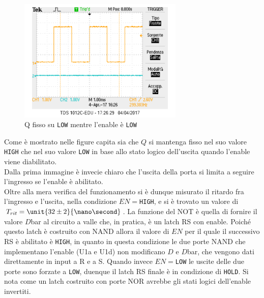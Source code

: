 \documentclass[a4paper,10pt]{article}
\def\code#1{\texttt{#1}}
\begin{document}
\begin{figure}[H]
	\centering
	\includegraphics[width=0.7\textwidth]{../grafici/EnableDown1.png}
	\caption{Q fisso su \code{LOW} mentre l'enable è \code{LOW}}
	\label{fig:FFD}
\end{figure}

Come è mostrato nelle figure capita sia che $Q$ si mantenga fisso nel suo valore \code{HIGH} che nel suo valore \code{LOW} in base allo stato logico dell'uscita quando l'enable viene diabilitato.\\
Dalla prima immagine è invecie chiaro che l'uscita della porta si limita a seguire l'ingresso se l'enable è abilitato.\\
Oltre alla mera verifica del funzionamento si è dunque misurato il ritardo fra l'ingresso e l'uscita, nella condizione $EN=$\code{HIGH}, e si è trovato un valore di $T_{rit}=\unit{32\pm 2 }{\nano\second}$.
\newline 
La funzione del NOT è quella di fornire il valore $D$bar al circuito a valle che, in pratica, è un latch RS con enable. 
Poiché questo latch è costruito con NAND allora il valore di $EN$ per il quale il successivo RS è abilitato è \code{HIGH}, in quanto in questa condizione le due porte NAND che implementano l'enable (U1a e U1d) non modificano $D$ e $D$bar, che vengono dati direttamente in input a R e a S. Quando invece $EN=$\code{LOW} le uscite delle due porte sono forzate a \code{LOW}, duenque il latch RS finale è in condizione di \code{HOLD}. Si nota come un latch costruito con porte NOR avrebbe gli stati logici dell'enable invertiti.



\end{document}
